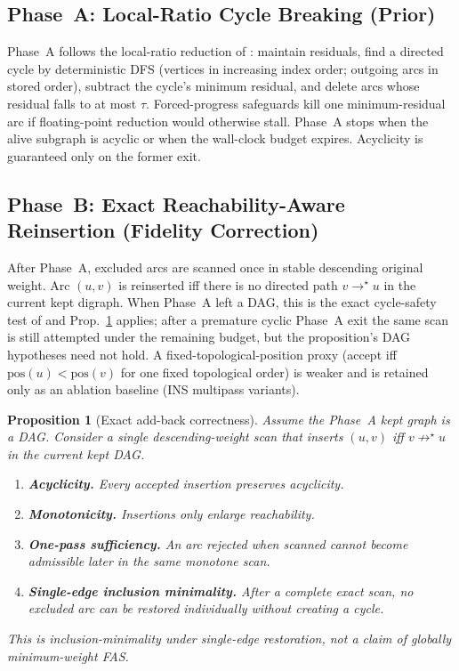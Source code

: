 \documentclass{article}
\newtheorem{proposition}{Proposition}
\begin{document}
\subsection{Phase~A: Local-Ratio Cycle Breaking (Prior)}
\label{subsec:framework_phaseA}
Phase~A follows the local-ratio reduction of \citet{CI03}: maintain residuals, find a directed cycle by deterministic DFS (vertices in increasing index order; outgoing arcs in stored order), subtract the cycle's minimum residual, and delete arcs whose residual falls to at most $\tau$. Forced-progress safeguards kill one minimum-residual arc if floating-point reduction would otherwise stall. Phase~A stops when the alive subgraph is acyclic or when the wall-clock budget expires. Acyclicity is guaranteed only on the former exit.

\subsection{Phase~B: Exact Reachability-Aware Reinsertion (Fidelity Correction)}
\label{subsec:framework_phaseB}
After Phase~A, excluded arcs are scanned once in stable descending original weight. Arc $(u,v)$ is reinserted iff there is no directed path $v\rightarrow^\star u$ in the current kept digraph. When Phase~A left a DAG, this is the exact cycle-safety test of \citet{CI03,VK25} and Prop.~\ref{prop:reachability_addback} applies; after a premature cyclic Phase~A exit the same scan is still attempted under the remaining budget, but the proposition's DAG hypotheses need not hold. A fixed-topological-position proxy (accept iff $\mathrm{pos}(u)<\mathrm{pos}(v)$ for one fixed topological order) is weaker and is retained only as an ablation baseline (INS multipass variants).

\begin{proposition}[Exact add-back correctness]
\label{prop:reachability_addback}
Assume the Phase~A kept graph is a DAG. Consider a single descending-weight scan that inserts $(u,v)$ iff $v\not\rightarrow^\star u$ in the current kept DAG.
\begin{enumerate}
\item \textbf{Acyclicity.} Every accepted insertion preserves acyclicity.
\item \textbf{Monotonicity.} Insertions only enlarge reachability.
\item \textbf{One-pass sufficiency.} An arc rejected when scanned cannot become admissible later in the same monotone scan.
\item \textbf{Single-edge inclusion minimality.} After a complete exact scan, no excluded arc can be restored individually without creating a cycle.
\end{enumerate}
This is inclusion-minimality under single-edge restoration, not a claim of globally minimum-weight FAS.
\end{proposition}
\end{document}

